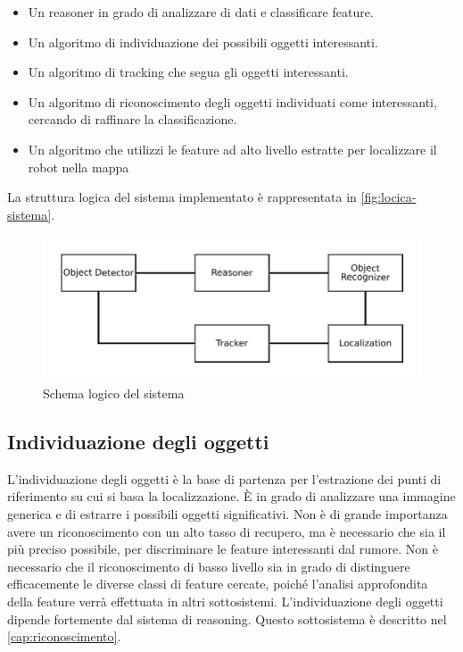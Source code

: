 \begin{itemize}
 \item Un reasoner in grado di analizzare di dati e classificare feature.
 \item Un algoritmo di individuazione dei possibili oggetti interessanti.
 \item Un algoritmo di tracking che segua gli oggetti interessanti.
 \item Un algoritmo di riconoscimento degli oggetti individuati come interessanti, cercando di raffinare la classificazione.
 \item Un algoritmo che utilizzi le feature ad alto livello estratte per localizzare il robot nella mappa
\end{itemize}

La struttura logica del sistema implementato è rappresentata in \autoref{fig:locica-sistema}.

\begin{figure}[ht]
  \includegraphics[width=\textwidth]{diagrammi/SchemaLogico}
  \caption{Schema logico del sistema}
  \label{fig:locica-sistema}
\end{figure}

\subsection{Individuazione degli oggetti}
L'individuazione degli oggetti è la base di partenza per l'estrazione dei punti di riferimento su cui si basa la localizzazione.
\`E in grado di analizzare una immagine generica e di estrarre i possibili oggetti significativi. Non è di grande importanza avere un riconoscimento con un alto tasso di recupero, ma è necessario che sia il più preciso possibile, per discriminare le feature interessanti dal rumore.
Non è necessario che il riconoscimento di basso livello sia in grado di distinguere efficacemente le diverse classi di feature cercate, poiché l'analisi approfondita della feature verrà effettuata in altri sottosistemi.
L'individuazione degli oggetti dipende fortemente dal sistema di reasoning.
Questo sottosistema è descritto nel \autoref{cap:riconoscimento}.

